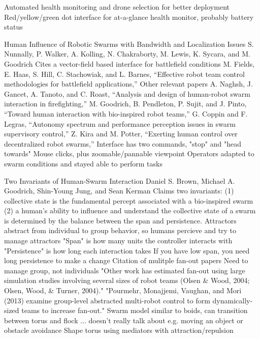 	Automated health monitoring and drone selection for better deployment
	Red/yellow/green dot interface for at-a-glance health monitor, probably battery status



\citep{nunnally2012human}
Human Influence of Robotic Swarms with Bandwidth and Localization Issues
S. Nunnally, P. Walker, A. Kolling, N. Chakraborty, M. Lewis, K. Sycara, and M. Goodrich
	Cites a vector-field based interface for battlefield conditions
		M. Fields, E. Haas, S. Hill, C. Stachowiak, and L. Barnes, “Effective robot team control methodologies for battlefield applications,”
	Other relevant papers
		A. Naghsh, J. Gancet, A. Tanoto, and C. Roast, “Analysis and design of human-robot swarm interaction in firefighting,”
		M. Goodrich, B. Pendleton, P. Sujit, and J. Pinto, “Toward human interaction with bio-inspired robot teams,”
		G. Coppin and F. Legras, “Autonomy spectrum and performance perception issues in swarm supervisory control,”
		Z. Kira and M. Potter, “Exerting human control over decentralized robot swarms,”
	Interface has two commands, "stop" and "head towards"
		Mouse clicks, plus zoomable/pannable viewpoint
	Operators adapted to swarm conditions and stayed able to perform tasks

\citep{brown2015two}
Two Invariants of Human-Swarm Interaction
Daniel S. Brown, Michael A. Goodrich, Shin-Young Jung, and Sean Kerman
	Claims two invariants:
		(1) collective state is the fundamental percept associated with a bio-inspired swarm
		(2) a human’s ability to influence and understand the collective state of a swarm is determined by the balance between the span and persistence.
	Attractors abstract from individual to group behavior, so humans percieve and try to manage attractors
	"Span" is how many units the controller interacts with
	"Persistence" is how long each interaction takes
		If you have low span, you need long persistence to make a change
	Citation of mulitple fan-out papers
		Need to manage group, not individuals
		"Other work has estimated fan-out using large simulation studies involving several sizes of robot teams (Olsen \& Wood, 2004; Olsen, Wood, \& Turner, 2004)."
		"Pourmehr, Monajjemi, Vaughan, and Mori (2013) examine group-level abstracted multi-robot control to form dynamically-sized teams to increase fan-out."
	Swarm model similar to boids, can transition between torus and flock
		... doesn't really talk about e.g. moving an object or obstacle avoidance
	Shape torus using mediators with attraction/repulsion

